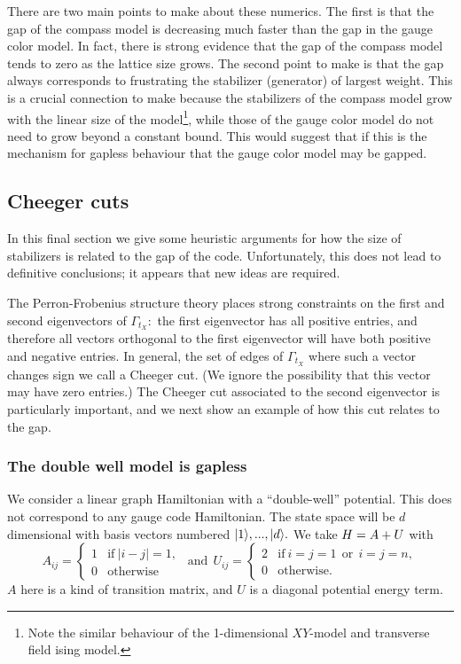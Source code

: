 There are two main points to make about these numerics.
The first is that the gap of the compass model 
is decreasing much faster than the gap in the gauge color model.
In fact, there is strong evidence \cite{Dorier2005} 
that the gap of the compass model
tends to zero as the lattice size grows.
The second point to make
is that the gap always corresponds to frustrating
the stabilizer (generator) of largest weight. 
This is a crucial connection to make because the
stabilizers of the compass model grow with the linear
size of the model\footnote{Note the similar
behaviour of the 1-dimensional $XY$-model and transverse field ising model.},
while those of the gauge color model
do not need to grow beyond a constant bound.
This would suggest that if this is the mechanism for
gapless behaviour that the gauge color model may
be gapped.

\subsection{Cheeger cuts}

In this final section
we give some heuristic
arguments for how the
size of stabilizers is
related to the gap of
the code. 
Unfortunately,
this does not lead to 
definitive conclusions;
it appears that new
ideas are required.

The Perron-Frobenius structure theory places
strong constraints on the first and second
eigenvectors of $\Gamma_{t_X}:$
the first eigenvector has all positive entries,
and therefore all vectors orthogonal to the first
eigenvector will have both positive and negative entries.
In general, the set of edges of $\Gamma_{t_X}$ where
such a vector changes sign we call a Cheeger cut.
(We ignore the possibility that this vector
may have zero entries.)
The Cheeger cut associated to the second eigenvector
is particularly important, and we next show an
example of how this cut relates to the gap.

\subsubsection{The double well model is gapless}

We consider a linear graph Hamiltonian
with a ``double-well'' potential.
This does not correspond to any gauge code Hamiltonian.
The state space will be $d$ dimensional with
basis vectors numbered $|{1}\rangle,...,|{d}\rangle.$
We take
$ H = A + U $
with
$$
A_{ij} = \left\{ \begin{array}{ll}
     1 &\mbox{if}\  |i-j|=1,  \\
     0 &\mbox{otherwise}\end{array}\right.
\ \ \mbox{and}\ \ 
U_{ij} =  \left\{ \begin{array}{ll}
     2 &\mbox{if}\  i=j=1 \ \ \mbox{or}\ \  i=j=n, \\
     0 &\mbox{otherwise.}\end{array}\right.
$$
$A$ here is a kind of transition matrix,
and $U$ is a diagonal potential energy term.

